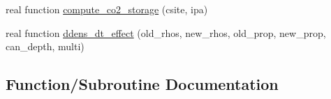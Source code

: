 \begin{DoxyCompactItemize}
\item 
real function \hyperlink{namespacebudget__utils_aa1c4f8466010b1673f2914f1bfe9b6ee}{compute\+\_\+co2\+\_\+storage} (csite, ipa)
\item 
real function \hyperlink{namespacebudget__utils_ae7ad8d90c28490b0b1c920e7a2656345}{ddens\+\_\+dt\+\_\+effect} (old\+\_\+rhos, new\+\_\+rhos, old\+\_\+prop, new\+\_\+prop, can\+\_\+depth, multi)
\end{DoxyCompactItemize}


\subsection{Function/\+Subroutine Documentation}
\hypertarget{namespacebudget__utils_ade80ff8e17018f7bd86015ee5f20375e}{}
